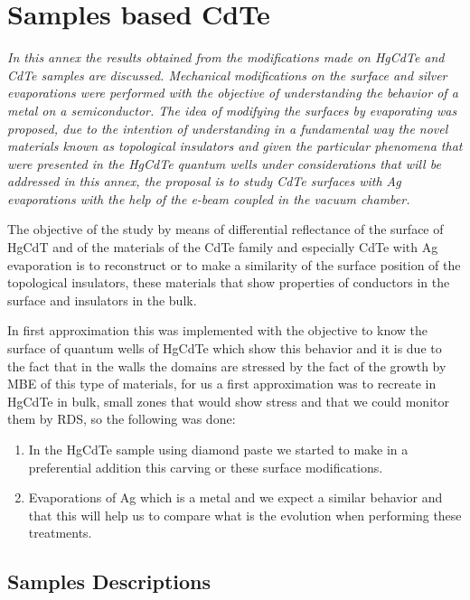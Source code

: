  \chapter{Samples based CdTe}
\label{chap:appendix2}
\textit{In this annex the results obtained from the modifications made on HgCdTe and CdTe samples are discussed. Mechanical modifications on the surface and silver evaporations were performed with the objective of understanding the behavior of a metal on a semiconductor. The idea of modifying the surfaces by evaporating was proposed, due to the intention of understanding in a fundamental way the novel materials known as topological insulators and given the particular phenomena that were presented in the HgCdTe quantum wells under considerations that will be addressed in this annex, the proposal is to study CdTe surfaces with Ag evaporations with the help of the e-beam coupled in the vacuum chamber.}
\vfill
\minitoc
\newpage

\allowdisplaybreaks

The objective of the study by means of differential reflectance of the surface of HgCdT and of the materials of the CdTe family and especially CdTe with Ag evaporation is to reconstruct or to make a similarity of the surface position of the topological insulators, these materials that show properties of conductors in the surface and insulators in the bulk. 

In first approximation this was implemented with the objective to know the surface of quantum wells of HgCdTe which show this behavior and it is due to the fact that in the walls the domains are stressed by the fact of the growth by MBE of this type of materials, for us a first approximation was to recreate in HgCdTe in bulk, small zones that would show stress and that we could monitor them by RDS, so the following was done: 

\begin{enumerate}
	\item In the HgCdTe sample using diamond paste we started to make in a preferential addition this carving or these surface modifications.
	\item Evaporations of Ag which is a metal and we expect a similar behavior and that this will help us to compare what is the evolution when performing these treatments. 
\end{enumerate}
\section{Samples Descriptions}
\vspace{-1cm}

